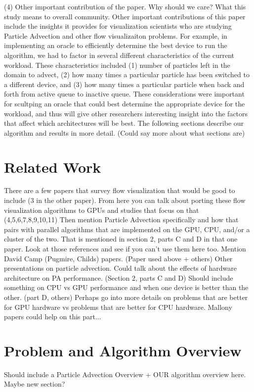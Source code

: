 \documentclass{IEEEtran}
\begin{document}
(4) Other important contribution of the paper. Why should we care? What this study means to overall community.
%
Other important contributions of this paper include the insights it provides for visualization scientists who are studying Particle Advection and other flow visualizaiton problems.
%
For example, in implementing an oracle to efficiently determine the best device to run the algorithm, we had to factor in several different characteristics of the current workload.
%
These characteristics included (1) number of particles left in the domain to advect, (2) how many times a particular particle has been switched to a different device, and (3) how many times a particular particle when back and forth from active queue to inactive queue.
%
These considerations were important for scultping an oracle that could best determine the appropriate device for the workload, and thus will give other researchers interesting insight into the factors that affect which architectures will be best.
%
The following sections describe our algorithm and results in more detail. 
%
(Could say more about what sections are)
%
\section{Related Work}
There are a few papers that survey flow visualization that would be good to include (3 in the other paper).
%
From here you can talk about porting these flow visualization algorithms to GPUs and studies that focus on that (4,5,6,7,8,9,10,11)
%
Then mention Particle Advection specifically and how that pairs with parallel algorithms that are implemented on the GPU, CPU, and/or a cluster of the two.
%
That is mentioned in section 2, parts C and D in that one paper.
%
Look at those references and see if you can't use them here too.
%
Mention David Camp (Pugmire, Childs) papers. (Paper used above + others)
%
Other presentations on particle advection.
%
Could talk about the effects of hardware architecture on PA performance. (Section 2, parts C and D)
%
Should include something on CPU vs GPU performance and when one device is better than the other. (part D, others)
%
Perhaps go into more details on problems that are better for GPU hardware vs problems that are better for CPU hardware.
%
Mallony papers could help on this part...
%
\section{Problem and Algorithm Overview}
Should include a Particle Advection Overview + OUR algorithm overview here. Maybe new section?
%
\end{document}

